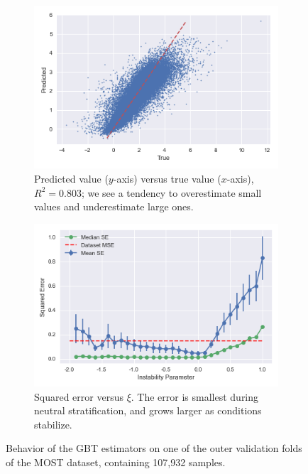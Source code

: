 \documentclass[a4paper,11pt]{kth-mag}
\begin{document}
\begin{figure}
    \centering
    \begin{subfigure}[t]{0.49\textwidth}
        \centering
        \includegraphics[width=\textwidth]{images/residuals_scatter}
        \caption{Predicted value ($y$-axis) versus true value ($x$-axis), $R^2=0.803$; we see a tendency to overestimate small values and underestimate large ones.}
        \label{fig:residuals_scatter}
    \end{subfigure}
    \hfill
    \begin{subfigure}[t]{0.49\textwidth}
        \centering
        \includegraphics[width=\textwidth]{images/error_by_xi}
        \caption{Squared error versus $\xi$. The error is smallest during neutral stratification, and grows larger as conditions stabilize.}
        \label{fig:error_by_wind}
    \end{subfigure}
    \caption{Behavior of the GBT estimators on one of the outer validation folds of the MOST dataset, containing 107,932 samples. }
	\label{fig:predictions}
\end{figure}
\end{document}
